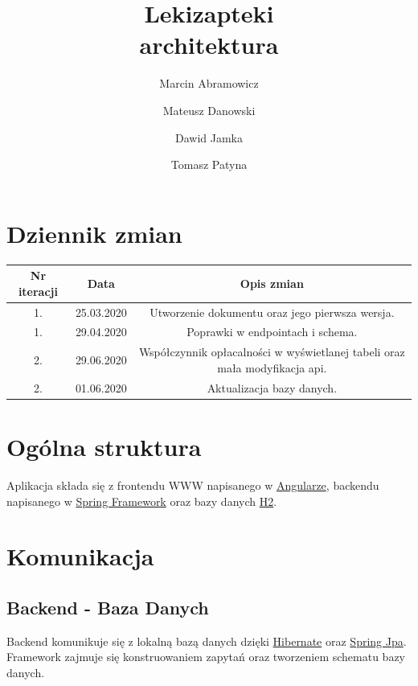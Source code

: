 \documentclass{article}
\title{
Lekizapteki\\
\large architektura}
\author{Marcin Abramowicz \and Mateusz Danowski \and Dawid Jamka \and Tomasz Patyna}
\begin{document}
  \maketitle

  \section{Dziennik zmian}
  \begin{tabular}{|c|c|c|}
    Nr iteracji & Data & Opis zmian \\
    \hline
    1. & 25.03.2020 & Utworzenie dokumentu oraz jego pierwsza wersja. \\
    \hline
    1. & 29.04.2020 & Poprawki w endpointach i schema. \\
    \hline
    2. & 29.06.2020 & Współczynnik opłacalności w wyświetlanej tabeli oraz mała modyfikacja api. \\
    \hline
    2. & 01.06.2020 & Aktualizacja bazy danych.
  \end{tabular}

  \section{Ogólna struktura}
  Aplikacja składa się z frontendu WWW napisanego w
  \href{https://angular.io}{Angularze}, backendu napisanego w
  \href{https://spring.io}{Spring Framework} oraz bazy danych
  \href {https://www.h2database.com/html/main.html}{H2}.

  \section{Komunikacja}
  \subsection{Backend - Baza Danych}
  Backend komunikuje się z lokalną bazą danych dzięki
  \href{https://hibernate.org}{Hibernate} oraz
  \href{https://spring.io/projects/spring-data-jpa} {Spring Jpa}.
  Framework zajmuje się konstruowaniem zapytań oraz tworzeniem schematu bazy danych.
\end{document}
